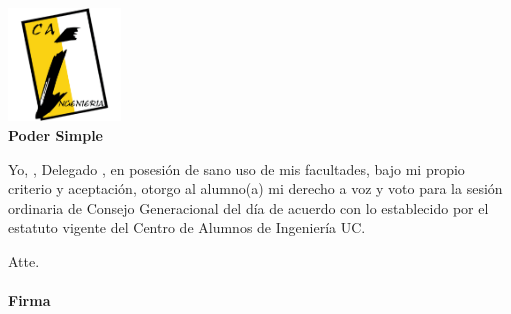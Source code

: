 \documentclass{caitemplate}
\begin{document}
\begin{center}
\includegraphics[height=3cm,valign=c]{cai.png}
\\
\vspace{10mm}
\huge \textbf{Poder Simple}
\vspace{5mm}
\end{center}

\begin{spacing}{2}

{\fontsize{12}{14}\selectfont
Yo, \underline{\hspace{5cm}} , Delegado \underline{\hspace{4cm}} \underline{\hspace{2cm}}, en posesión de sano uso de mis facultades, bajo mi propio criterio y aceptación, otorgo al alumno(a)   
\underline{\hspace{5cm}} mi derecho a voz y voto para la sesión ordinaria de Consejo Generacional del día \underline{\hspace{4cm}} de acuerdo con lo establecido por el estatuto vigente del Centro de Alumnos de Ingeniería UC.

\vspace{8mm}
\begin{center}
Atte.\\
\underline{\hspace{4cm}}\\
\textbf{Firma}\\
\end{center}
}

\end{spacing}
\end{document}

